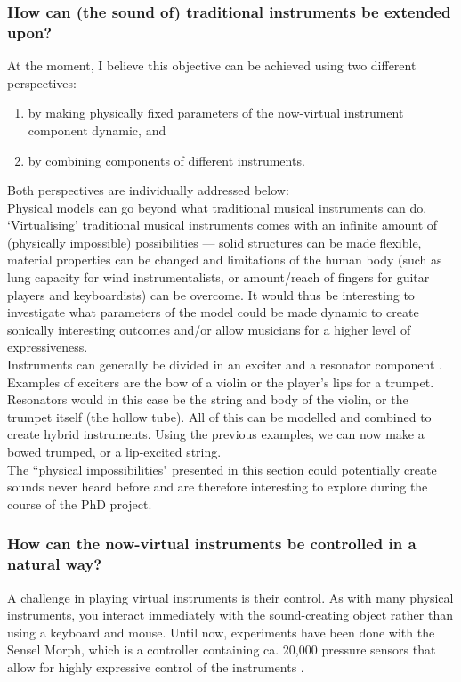 \subsubsection*{How can (the sound of) traditional instruments be extended upon?}
At the moment, I believe this objective can be achieved using two different perspectives: 
\begin{enumerate}
    \item by making physically fixed parameters of the now-virtual instrument component dynamic, and
    \item by combining components of different instruments.
\end{enumerate}
Both perspectives are individually addressed below:
\\

\noindent Physical models can go beyond what traditional musical instruments can do. ‘Virtualising’ traditional musical instruments comes with an infinite amount of (physically impossible) possibilities — solid structures can be made flexible, material properties can be changed and limitations of the human body (such as lung capacity for wind instrumentalists, or amount/reach of fingers for guitar players and keyboardists) can be overcome. It would thus be interesting to investigate what parameters of the model could be made dynamic to create sonically interesting outcomes and/or allow musicians for a higher level of expressiveness.
\\

\noindent Instruments can generally be divided in an exciter and a resonator component \cite{Borin1989}. Examples of exciters are the bow of a violin or the player's lips for a trumpet. Resonators would in this case be the string and body of the violin, or the trumpet itself (the hollow tube). All of this can be modelled and combined to create hybrid instruments. Using the previous examples, we can now make a bowed trumped, or a lip-excited string.
\\

\noindent The ``physical impossibilities" presented in this section could potentially create sounds never heard before and are therefore interesting to explore during the course of the PhD project. 

\subsubsection*{How can the now-virtual instruments be controlled in a natural way?}
A challenge in playing virtual instruments is their control. As with many physical instruments, you interact immediately with the sound-creating object rather than using a keyboard and mouse. Until now, experiments have been done with the Sensel Morph, which is a controller containing ca. 20,000 pressure sensors that allow for highly expressive control of the instruments \cite{Sensel2019}.

